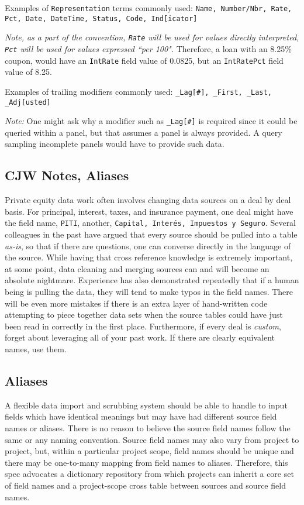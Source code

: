 \documentclass[10pt]{article}
\begin{document}
Examples of {\tt Representation} terms commonly used: {\tt Name, Number/Nbr, Rate, Pct, Date, DateTime, Status, Code, Ind[icator]} \par
{\em Note, as a part of the convention, {\tt Rate} will be used for values directly interpreted, {\tt Pct} will be used for 
values expressed ``per 100".}  Therefore, a loan with an 8.25\% coupon, would have an {\tt IntRate} field value of 0.0825, but an 
{\tt IntRatePct} field value of 8.25.

Examples of trailing modifiers commonly used: {\tt \_Lag[\#], \_First, \_Last, \_Adj[usted]} \par
{\em Note:} One might ask why a modifier such as {\tt \_Lag[\#]} is required since it could be queried within a panel, but that assumes 
a panel is always provided.   A query sampling  incomplete panels would have to provide such data.

\ifcommentary

\subsection{CJW Notes, Aliases}
Private equity data work often involves changing data sources on a deal by deal basis. For principal, interest, taxes, and insurance payment,
one deal might have the field name, 
\verb+PITI+, another, {\tt Capital, Interés, Impuestos y Seguro}.  Several 
colleagues in the past have argued that every source should be pulled into a table {\em as-is}, so that 
if there are questions, one can converse directly in the language of the source.   While having that cross 
reference knowledge is extremely important, at some point, data cleaning and merging sources can and will become an absolute nightmare.  
Experience has also demonstrated repeatedly that if a human being is pulling the data, they will tend to 
make typos in the field names.  There will be even more mistakes if there is an extra layer of hand-written code
attempting to piece together data sets when the source tables could have just been read in correctly in the first place.
Furthermore, if every deal is {\em custom}, forget about leveraging all of your past work.  If there are clearly
equivalent names, use them.

\fi

\subsection{Aliases}
A flexible data import and scrubbing system should be able to handle to input fields which have identical meanings
but may have had different source field names or aliases.  There is no reason to believe the source field names
follow the same or any naming convention.  Source field names may also vary from project to project, but, within
a particular project scope, field names should be unique and there may be one-to-many mapping from field names
to aliases.   Therefore, this spec advocates a dictionary repository from which projects can inherit a core set
of field names and a  project-scope cross table between sources and source field names.
\end{document}
